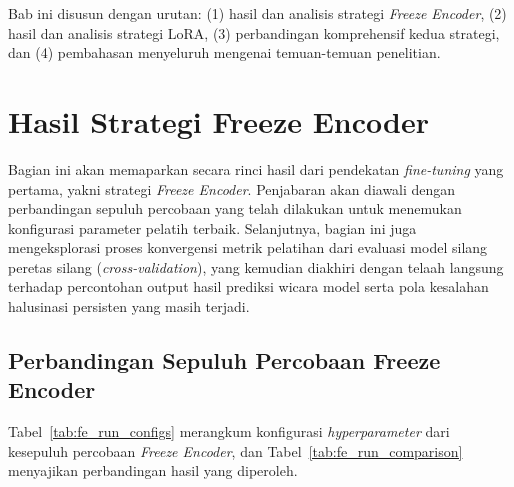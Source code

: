 Bab ini disusun dengan urutan: (1) hasil dan analisis strategi \textit{Freeze Encoder}, (2) hasil dan analisis strategi LoRA, (3) perbandingan komprehensif kedua strategi, dan (4) pembahasan menyeluruh mengenai temuan-temuan penelitian.

\section{Hasil Strategi Freeze Encoder} \label{IV.FreezeEncoder}

Bagian ini akan memaparkan secara rinci hasil dari pendekatan \textit{fine-tuning} yang pertama, yakni strategi \textit{Freeze Encoder}. Penjabaran akan diawali dengan perbandingan sepuluh percobaan yang telah dilakukan untuk menemukan konfigurasi parameter pelatih terbaik. Selanjutnya, bagian ini juga mengeksplorasi proses konvergensi metrik pelatihan dari evaluasi model silang peretas silang (\textit{cross-validation}), yang kemudian diakhiri dengan telaah langsung terhadap percontohan output hasil prediksi wicara model serta pola kesalahan halusinasi persisten yang masih terjadi.

\subsection{Perbandingan Sepuluh Percobaan Freeze Encoder}

Tabel~\ref{tab:fe_run_configs} merangkum konfigurasi \textit{hyperparameter} dari kesepuluh percobaan \textit{Freeze Encoder}, dan Tabel~\ref{tab:fe_run_comparison} menyajikan perbandingan hasil yang diperoleh.

